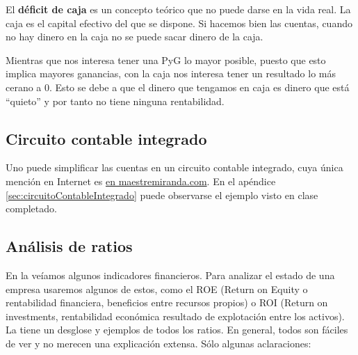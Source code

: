 \documentclass[nochap,palatino,shortheader]{apuntes}
\begin{document}
El \textbf{déficit de caja} es un concepto teórico que no puede darse en la vida real. La caja es el capital efectivo del que se dispone. Si hacemos bien las cuentas, cuando no hay dinero en la caja no se puede sacar dinero de la caja.

\obs Mientras que nos interesa tener una PyG lo mayor posible, puesto que esto implica mayores ganancias, con la caja nos interesa tener un resultado lo más cerano a 0. Esto se debe a que el dinero que tengamos en caja es dinero que está ``quieto'' y por tanto no tiene ninguna rentabilidad.

\subsection{Circuito contable integrado}

Uno puede simplificar las cuentas en un circuito contable integrado, cuya única mención en Internet es \href{http://maestremiranda.com/techdir/wp-content/uploads/2015/10/CircuitoContable.pdf}{en maestremiranda.com}. En el apéndice \ref{sec:circuitoContableIntegrado} puede observarse el ejemplo visto en clase completado.

\subsection{Análisis de ratios}

En la  veíamos algunos indicadores financieros. Para analizar el estado de una empresa usaremos algunos de estos, como el ROE (Return on Equity o rentabilidad financiera, beneficios entre recursos propios) o ROI (Return on investments, rentabilidad económica resultado de explotación entre los activos). La  tiene un desglose y ejemplos de todos los ratios. En general, todos son fáciles de ver y no merecen una explicación extensa. Sólo algunas aclaraciones:
\end{document}
